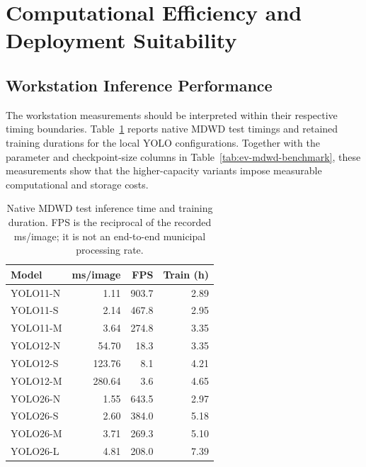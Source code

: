 \clearpage
\section{Computational Efficiency and Deployment Suitability}
\label{sec:ev-deployment}
\subsection{Workstation Inference Performance}
\label{sec:ev-workstation}
The workstation measurements should be interpreted within their respective timing boundaries. Table~\ref{tab:ev-mdwd-runtime} reports native MDWD test timings and retained training durations for the local YOLO configurations. Together with the parameter and checkpoint-size columns in Table~\ref{tab:ev-mdwd-benchmark}, these measurements show that the higher-capacity variants impose measurable computational and storage costs.

\begin{table}[htbp]
\centering
\small
\caption{Native \gls{MDWD} test inference time and training duration. FPS is the reciprocal of the recorded ms/image; it is not an end-to-end municipal processing rate.}
\label{tab:ev-mdwd-runtime}
\renewcommand{\arraystretch}{1.15}
\begin{tabularx}{\textwidth}{@{}>{\raggedright\arraybackslash}Xrrr@{}}
\toprule
Model & ms/image & FPS & Train (h) \\
\midrule
YOLO11-N & 1.11 & 903.7 & 2.89 \\
YOLO11-S & 2.14 & 467.8 & 2.95 \\
YOLO11-M & 3.64 & 274.8 & 3.35 \\
YOLO12-N & 54.70 & 18.3 & 3.35 \\
YOLO12-S & 123.76 & 8.1 & 4.21 \\
YOLO12-M & 280.64 & 3.6 & 4.65 \\
YOLO26-N & 1.55 & 643.5 & 2.97 \\
YOLO26-S & 2.60 & 384.0 & 5.18 \\
YOLO26-M & 3.71 & 269.3 & 5.10 \\
YOLO26-L & 4.81 & 208.0 & 7.39 \\
\bottomrule
\end{tabularx}
\end{table}


